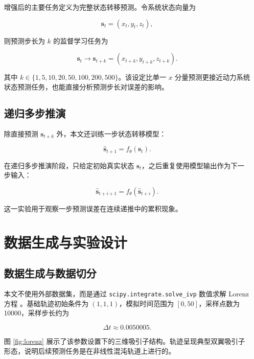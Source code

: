 \documentclass[UTF8,a4paper,12pt]{ctexart}
\begin{document}
增强后的主要任务定义为完整状态转移预测。令系统状态向量为

\begin{equation}
\mathbf{s}_t=(x_t,y_t,z_t),
\end{equation}

则预测步长为 $k$ 的监督学习任务为

\begin{equation}
\mathbf{s}_t\rightarrow \mathbf{s}_{t+k}=(x_{t+k},y_{t+k},z_{t+k}).
\end{equation}

其中 $k\in\{1,5,10,20,50,100,200,500\}$。该设定比单一 $x$ 分量预测更接近动力系统状态预测任务，也能直接分析预测步长对误差的影响。

\subsection{递归多步推演}

除直接预测 $\mathbf{s}_{t+k}$ 外，本文还训练一步状态转移模型：

\begin{equation}
\hat{\mathbf{s}}_{t+1}=f_\theta(\mathbf{s}_t).
\end{equation}

在递归多步推演阶段，只给定初始真实状态 $\mathbf{s}_t$，之后重复使用模型输出作为下一步输入：

\begin{equation}
\hat{\mathbf{s}}_{t+i+1}=f_\theta(\hat{\mathbf{s}}_{t+i}).
\end{equation}

这一实验用于观察一步预测误差在连续递推中的累积现象。

\section{数据生成与实验设计}

\subsection{数据生成与数据切分}

本文不使用外部数据集，而是通过 \texttt{scipy.integrate.solve\_ivp} 数值求解 Lorenz 方程 \cite{virtanen2020}。基础轨迹初始条件为 $(1,1,1)$，模拟时间范围为 $[0,50]$，采样点数为 10000，采样步长约为

\begin{equation}
\Delta t \approx 0.0050005.
\end{equation}

图 \ref{fig:lorenz} 展示了该参数设置下的三维吸引子结构。轨迹呈现典型双翼吸引子形态，说明后续预测任务是在非线性混沌轨道上进行的。
\end{document}
